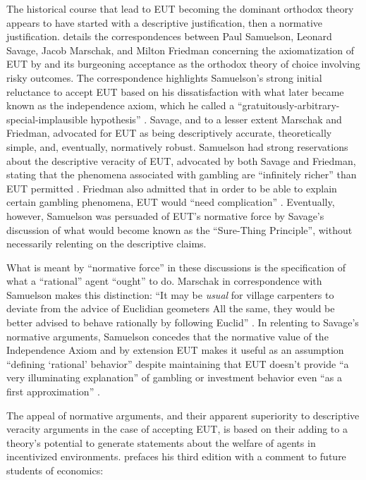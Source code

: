 \documentclass[../main.tex]{subfiles}
\begin{document}
The historical course that lead to EUT becoming the dominant orthodox theory appears to have started with a descriptive justification, then a normative justification.
\textcite{Moscati2016} details the correspondences between Paul Samuelson, Leonard Savage, Jacob Marschak, and Milton Friedman concerning the axiomatization of EUT by \textcite{VonNeumann1944} and its burgeoning acceptance as the orthodox theory of choice involving risky outcomes.
The correspondence highlights Samuelson's strong initial reluctance to accept EUT based on his dissatisfaction with what later became known as the independence axiom, which he called a \enquote{gratuitously-arbitrary-special-implausible hypothesis} \parencite[225]{Moscati2016}.
Savage, and to a lesser extent Marschak and Friedman, advocated for EUT as being descriptively accurate, theoretically simple, and, eventually, normatively robust.
Samuelson had strong reservations about the descriptive veracity of EUT, advocated by both Savage and Friedman, stating that the phenomena associated with gambling are \enquote{infinitely richer} than EUT permitted \parencite[227]{Moscati2016}.
Friedman also admitted that in order to be able to explain certain gambling phenomena, EUT would \enquote{need complication} \parencite[229]{Moscati2016}.
Eventually, however, Samuelson was persuaded of EUT's normative force by Savage's discussion of what would become known as the \enquote{Sure-Thing Principle}, without necessarily relenting on the descriptive claims.

What is meant by \enquote{normative force} in these discussions is the specification of what a \enquote{rational} agent \enquote{ought} to do.
Marschak in correspondence with Samuelson makes this distinction:
\enquote{It may be \textit{usual} for village carpenters \textelp{} to deviate from the advice of Euclidian geometers \textelp{} All the same, they would be better advised to behave rationally by following Euclid} \parencite[229]{Moscati2016}.
In relenting to Savage's normative arguments, Samuelson concedes that the normative value of the Independence Axiom and by extension EUT makes it useful as an assumption \enquote{defining \enquote{rational} behavior} \parencite[231]{Moscati2016} despite maintaining that EUT doesn't provide \enquote{a very illuminating explanation} of gambling or investment behavior even \enquote{as a first approximation} \parencite[232]{Moscati2016}.

The appeal of normative arguments, and their apparent superiority to descriptive veracity arguments in the case of accepting EUT, is based on their adding to a theory's potential to generate statements about the welfare of agents in incentivized environments.
\textcite[preface to the third edition]{Pigou1929} prefaces his third edition with a comment to future students of economics:
\end{document}
